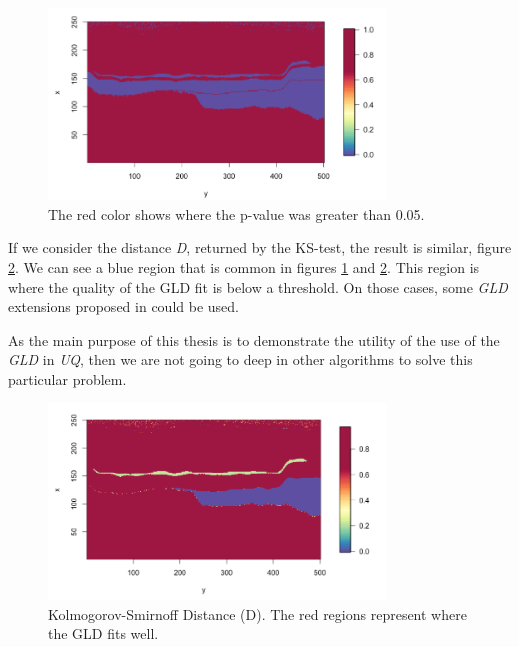 \begin{figure}[H]
    \centering
    \includegraphics[width=0.8\textwidth]{images/p_value_greater_05.png}
    \caption{The red color shows where the p-value was greater than 0.05.}
    \label{fig:p_values_greater_05}
\end{figure}

If we consider the distance \textit{D}, returned by the KS-test, the result is similar, figure \ref{fig:kolmogorov_distance}. We can see a blue region that is common in figures \ref{fig:p_values_greater_05} and \ref{fig:kolmogorov_distance}. This region is where the quality of the GLD fit is below a threshold. 
On those cases, some \textit{GLD} extensions proposed in \cite{Karian2011} could be used.

As the main purpose of this thesis is to demonstrate the utility of the use of the \textit{GLD} in \textit{UQ}, then we are not going to deep in other algorithms to solve this particular problem.

\begin{figure}[H]
    \centering
    \includegraphics[width=0.8\textwidth]{images/kolmogorov_distance.png}
    \caption{Kolmogorov-Smirnoff Distance (D). The red regions represent where the GLD fits well.}
    \label{fig:kolmogorov_distance}
\end{figure}

